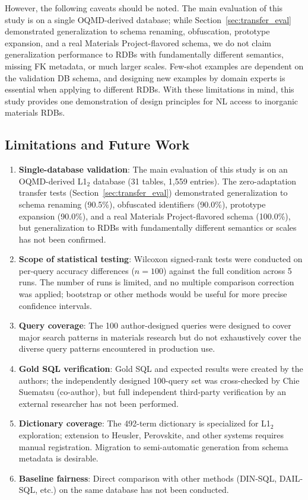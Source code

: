 \documentclass{npj-compt.mater}
\begin{document}
However, the following caveats should be noted.
The main evaluation of this study is on a single OQMD-derived
database; while Section~\ref{sec:transfer_eval} demonstrated
generalization to schema renaming, obfuscation, prototype
expansion, and a real Materials Project-flavored schema, we do not
claim generalization performance to RDBs with fundamentally
different semantics, missing FK metadata, or much larger scales.
Few-shot examples are dependent on the validation DB schema, and
designing new examples by domain experts is essential when applying
to different RDBs.
With these limitations in mind, this study provides one
demonstration of design principles for NL access to inorganic
materials RDBs.

\subsection{Limitations and Future Work}

\begin{enumerate}
  \item \textbf{Single-database validation}:
    The main evaluation of this study is on an OQMD-derived L1$_2$
    database (31 tables, 1{,}559 entries).
    The zero-adaptation transfer tests
    (Section~\ref{sec:transfer_eval}) demonstrated generalization
    to schema renaming (90.5\%), obfuscated identifiers (90.0\%),
    prototype expansion (90.0\%), and a real Materials
    Project-flavored schema (100.0\%), but generalization to RDBs
    with fundamentally different semantics or scales has not been
    confirmed.
  \item \textbf{Scope of statistical testing}:
    Wilcoxon signed-rank tests were conducted on per-query accuracy
    differences ($n=100$) against the full condition across 5 runs.
    The number of runs is limited, and no multiple comparison
    correction was applied; bootstrap or other methods would be useful
    for more precise confidence intervals.
  \item \textbf{Query coverage}:
    The 100 author-designed queries were designed to cover major
    search patterns in materials research but do not exhaustively
    cover the diverse query patterns encountered in production use.
  \item \textbf{Gold SQL verification}:
    Gold SQL and expected results were created by the authors;
    the independently designed 100-query set was cross-checked by
    Chie Suematsu (co-author), but full independent third-party
    verification by an external researcher has not been performed.
  \item \textbf{Dictionary coverage}:
    The 492-term dictionary is specialized for L1$_2$ exploration;
    extension to Heusler, Perovskite, and other systems requires
    manual registration.
    Migration to semi-automatic generation from schema metadata
    is desirable.
  \item \textbf{Baseline fairness}:
    Direct comparison with other methods (DIN-SQL, DAIL-SQL, etc.)
    on the same database has not been conducted.
\end{enumerate}
\end{document}
